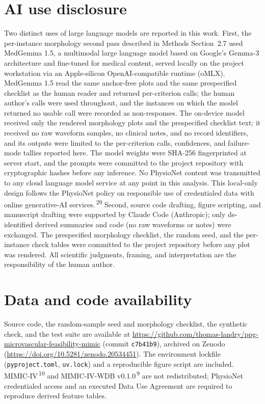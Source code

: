 \documentclass[twocolumn,letterpaper,10pt]{article}
\renewcommand{\cite}[1]{\textsuperscript{\,#1}}
\begin{document}

\section*{AI use disclosure}

Two distinct uses of large language models are reported in this work. First, the per-instance morphology second pass described in Methods Section~2.7 used MedGemma 1.5, a multimodal large language model based on Google's Gemma-3 architecture and fine-tuned for medical content, served locally on the project workstation via an Apple-silicon OpenAI-compatible runtime (oMLX). MedGemma 1.5 read the same anchor-free plots and the same prespecified checklist as the human reader and returned per-criterion calls; the human author's calls were used throughout, and the instances on which the model returned no usable call were recorded as non-responses. The on-device model received only the rendered morphology plots and the prespecified checklist text; it received no raw waveform samples, no clinical notes, and no record identifiers, and its outputs were limited to the per-criterion calls, confidences, and failure-mode tallies reported here. The model weights were SHA-256 fingerprinted at server start, and the prompts were committed to the project repository with cryptographic hashes before any inference. No PhysioNet content was transmitted to any cloud language model service at any point in this analysis. This local-only design follows the PhysioNet policy on responsible use of credentialed data with online generative-AI services.\cite{29} Second, source code drafting, figure scripting, and manuscript drafting were supported by Claude Code (Anthropic); only de-identified derived summaries and code (no raw waveforms or notes) were exchanged. The prespecified morphology checklist, the random seed, and the per-instance check tables were committed to the project repository before any plot was rendered. All scientific judgments, framing, and interpretation are the responsibility of the human author.

\section*{Data and code availability}

Source code, the random-sample seed and morphology checklist, the synthetic check, and the test suite are available at \url{https://github.com/thomas-landry/ppg-microvascular-feasibility-mimic} (commit \texttt{c7b41b9}), archived on Zenodo (\url{https://doi.org/10.5281/zenodo.20534451}). The environment lockfile (\texttt{pyproject.toml}, \texttt{uv.lock}) and a reproducible figure script are included. MIMIC-IV\cite{10} and MIMIC-IV-WDB v0.1.0\cite{9} are not redistributed; PhysioNet credentialed access and an executed Data Use Agreement are required to reproduce derived feature tables.
\end{document}

